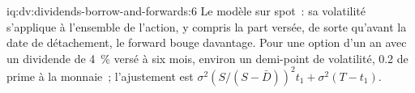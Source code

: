 \begin{solution}{iq:dv:dividends-borrow-and-forwards:6}
Le modèle sur spot~: sa volatilité s'applique à l'ensemble de l'action, y compris la part versée,
de sorte qu'avant la date de détachement, le forward bouge davantage. Pour une option d'un an avec un dividende de 4~\% versé à
six mois, environ un demi-point de volatilité, 0.2 de prime à la monnaie~; l'ajustement est
$\sigma^2(S/(S-\bar D))^2t_1+\sigma^2(T-t_1)$.
\end{solution}
